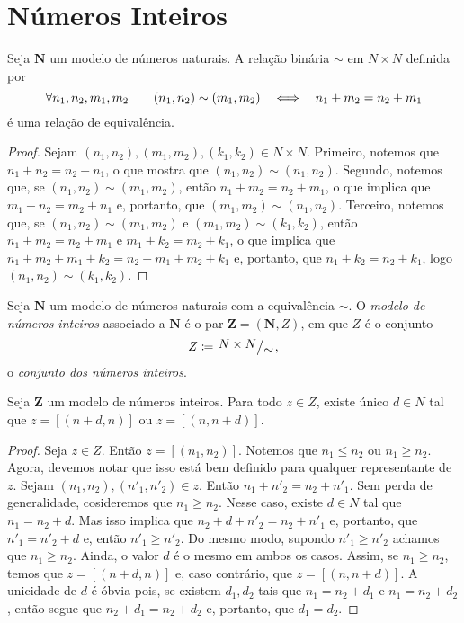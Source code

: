 \section{Números Inteiros}

\begin{prop}
	Seja $\bm N$ um modelo de números naturais. A relação binária $\sim$ em $N \times N$ definida por
	\begin{equation*}
	\forall n_1,n_2,m_1,m_2 \qquad (n_1,n_2) \sim (m_1,m_2) \quad \Longleftrightarrow \quad n_1+m_2=n_2+m_1
	\end{equation*}
é uma relação de equivalência.
\end{prop}
\begin{proof}
	Sejam $(n_1,n_2), (m_1,m_2),(k_1,k_2) \in N \times N$. Primeiro, notemos que $n_1+n_2=n_2+n_1$, o que mostra que $(n_1,n_2) \sim (n_1,n_2)$. Segundo, notemos que, se $(n_1,n_2) \sim (m_1,m_2)$, então $n_1+m_2=n_2+m_1$, o que implica que $m_1+n_2=m_2+n_1$ e, portanto, que $(m_1,m_2) \sim (n_1,n_2)$. Terceiro, notemos que, se $(n_1,n_2) \sim (m_1,m_2)$ e $(m_1,m_2) \sim (k_1,k_2)$, então $n_1+m_2=n_2+m_1$ e $m_1+k_2=m_2+k_1$, o que implica que $n_1+m_2+m_1+k_2=n_2+m_1+m_2+k_1$ e, portanto, que $n_1+k_2=n_2+k_1$, logo $(n_1,n_2) \sim (k_1,k_2)$.
\end{proof}

\begin{defi}
	Seja $\bm N$ um modelo de números naturais com a equivalência $\sim$. O \emph{modelo de números inteiros} associado a $\bm N$ é o par $\bm Z = (\bm N,Z)$, em que $Z$ é o conjunto 
	\begin{equation*}
	Z \coloneqq \quo{N \times N}{\sim},
	\end{equation*}
o \emph{conjunto dos números inteiros}.
\end{defi}

\begin{prop}
	Seja $\bm Z$ um modelo de números inteiros. Para todo $z \in Z$, existe único $d \in N$ tal que $z=[(n+d,n)]$ ou $z=[(n,n+d)]$.
\end{prop}
\begin{proof}
	Seja $z \in Z$. Então $z=[(n_1,n_2)]$. Notemos que $n_1 \leq n_2$ ou $n_1 \geq n_2$. Agora, devemos notar que isso está bem definido para qualquer representante de $z$. Sejam $(n_1,n_2),(n'_1,n'_2) \in z$. Então $n_1+n'_2=n_2+n'_1$. Sem perda de generalidade, cosideremos que $n_1 \geq n_2$. Nesse caso, existe $d \in N$ tal que $n_1=n_2+d$. Mas isso implica que $n_2+d+n'_2=n_2+n'_1$ e, portanto, que $n'_1=n'_2+d$ e, então $n'_1 \geq n'_2$. Do mesmo modo, supondo $n'_1 \geq n'_2$ achamos que $n_1 \geq n_2$. Ainda, o valor $d$ é o mesmo em ambos os casos. Assim, se $n_1 \geq n_2$, temos que $z=[(n+d,n)]$ e, caso contrário, que $z=[(n,n+d)]$. A unicidade de $d$ é óbvia pois, se existem $d_1,d_2$ tais que $n_1=n_2+d_1$ e $n_1=n_2+d_2$, então segue que $n_2+d_1=n_2+d_2$ e, portanto, que $d_1=d_2$.
\end{proof}


